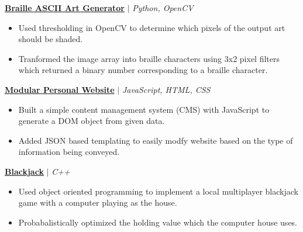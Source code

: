 \documentclass{article}
\newcommand{\smallbullet}{\,\begin{picture}(-1,1)(-1,-3)\circle*{3}\end{picture}\ }
\newenvironment{resumeItem}
{
    \vspace{0.5em}
}
{
}
\newcommand{\projectHead}[3]{
    \textbf{#1} $\vert$ \textit{#2} \\[-1.2em]
}
\newenvironment{resumeList}
{
    \begin{itemize}[label=\smallbullet]
}
{
    \end{itemize}
}
\begin{document}

\begin{resumeItem}
\projectHead{\href{https://github.com/arnavcs/ASCII-art}{Braille ASCII Art Generator}}{Python, OpenCV}{Apr 2021 - Jul 2021}
\begin{resumeList}
    \item Used thresholding in OpenCV to determine which pixels of the output art should be shaded.
    \item Tranformed the image array into braille characters using 3x2 pixel filters which returned a binary number corresponding to a braille character.
\end{resumeList}
\end{resumeItem}

\begin{resumeItem}
\projectHead{\href{https://github.com/arnavcs/arnavcs.github.io}{Modular Personal Website}}{JavaScript, HTML, CSS}{Mar 2022 - Aug 2022}
\begin{resumeList}
    \item Built a simple content management system (CMS) with JavaScript to generate a DOM object from given data.
    \item Added JSON based templating to easily modfy website based on the type of information being conveyed.
\end{resumeList}
\end{resumeItem}

\begin{resumeItem}
\projectHead{\href{https://github.com/arnavcs/black-jack}{Blackjack}}{C++}{Apr 2021 - Jul 2021}
\begin{resumeList}
    \item Used object oriented programming to implement a local multiplayer blackjack game with a computer playing as the house.
    \item Probabalistically optimized the holding value which the computer house uses.
\end{resumeList}
\end{resumeItem}
\end{document}
